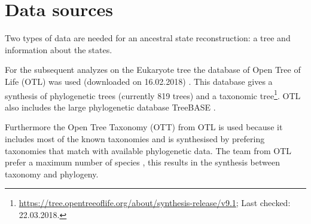   \section{Data sources} \label{sec:methods - data sources}
    Two types of data are needed for an ancestral state reconstruction: a tree and information about 
      the states.

    For the subsequent analyzes on the Eukaryote tree the database of Open Tree of Life (OTL) was used 
      (downloaded on 16.02.2018) \cite{Hinchliff2015}. This database gives a synthesis of phylogenetic 
      trees (currently 819 trees) and a taxonomic tree\footnote{
        \hyperlink{https://tree.opentreeoflife.org/about/synthesis-release/v9.1}
        {https://tree.opentreeoflife.org/about/synthesis-release/v9.1}; Last checked: 22.03.2018.
      }. OTL also  includes the large phylogenetic database TreeBASE \cite{Hinchliff2015}.
      
    Furthermore the Open Tree Taxonomy (OTT) from OTL is used because it includes most of the known 
      taxonomies and is synthesised by prefering taxonomies that match with available phylogenetic 
      data. The team from OTL prefer a maximum number of species \cite{Hinchliff2015}, this results 
      in the synthesis between taxonomy and phylogeny.

